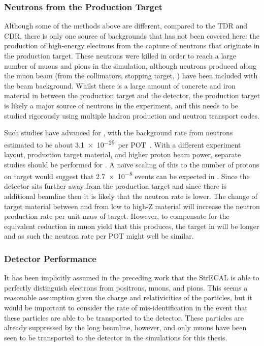 \subsubsection*{Neutrons from the Production Target}
Although some of the methods above are different, compared to the \phaseI TDR and \phaseII CDR, there is only one source of backgrounds that has not been covered here:
the production of high-energy electrons from the capture of neutrons that originate in the production target.
These neutrons were killed in order to reach a large number of muons and pions in the simulation, although neutrons produced along the muon beam (from the collimators, stopping target, \etc) have been included with the beam background.
Whilst there is a large amount of concrete and iron material in between the production target and the detector, the production target is likely a major source of neutrons in the experiment, and this needs to be studied rigorously using multiple hadron production and neutron transport codes.

Such studies have advanced for \phaseI, with the background rate from neutrons estimated to be about \num{3.1e-29}~per \ac{POT}~\cite{TDR2016}.
With a different experiment layout, production target material, and higher proton beam power, separate studies should be performed  for \phaseII.
A na\"{i}ve scaling of this to the \phaseII number of protons on target would suggest that \num{2.7e-8} events can be expected in \phaseII.
Since the detector sits further away from the production target and since there is additional beamline then it is likely that the neutron rate is lower.
The change of target material between \phaseI and \phaseII from low to high-Z material will increase the neutron production rate per unit mass of target.
However, to compensate for the equivalent reduction in muon yield that this produces, the target in \phaseI will be longer and as such the neutron rate per POT might well be similar.

\subsubsection*{Detector Performance}
It has been implicitly assumed in the preceding work that the StrECAL is able to perfectly distinguish electrons from positrons, muons, and pions.
This seems a reasonable assumption given the charge and relativicities of the particles, but it would be important to consider the rate of mis-identification in the event that these particles are able to be transported to the detector.
These particles are already suppressed by the long beamline, however, and only muons have been seen to be transported to the detector in the simulations for this thesis.

